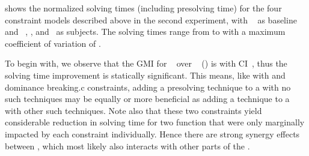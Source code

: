  shows the normalized solving
times (including \gls{presolving} time) for the four \glspl{constraint model}
described above in the second experiment, with ~ as \gls{baseline} and ~, ,
and~ as \glspl{subject}.
%
The solving times range from
\printMinSolvingTime{
  \SolvTechEnableOnlyGoodPresolvingPrePlusSolvingTimeSpeedupNonePrePlusSolvingTimeAvgMin,
  \SolvTechEnableOnlyGoodPresolvingPrePlusSolvingTimeSpeedupPrePlusSolvingTimeAvgMin,
  \SolvTechDisableBadPresolvingPrePlusSolvingTimeSpeedupPrePlusSolvingTimeAvgMin,
  \SolvTechDisableAllPresolvingPrePlusSolvingTimeSpeedupPrePlusSolvingTimeAvgMin
} to
\printMaxSolvingTime{
  \SolvTechEnableOnlyGoodPresolvingPrePlusSolvingTimeSpeedupNonePrePlusSolvingTimeAvgMax,
  \SolvTechEnableOnlyGoodPresolvingPrePlusSolvingTimeSpeedupPrePlusSolvingTimeAvgMax,
  \SolvTechDisableBadPresolvingPrePlusSolvingTimeSpeedupPrePlusSolvingTimeAvgMax,
  \SolvTechDisableAllPresolvingPrePlusSolvingTimeSpeedupPrePlusSolvingTimeAvgMax
} with a maximum coefficient of variation of
\numMaxOf{
  \SolvTechEnableOnlyGoodPresolvingPrePlusSolvingTimeSpeedupNonePrePlusSolvingTimeCvMax,
  \SolvTechEnableOnlyGoodPresolvingPrePlusSolvingTimeSpeedupPrePlusSolvingTimeCvMax,
  \SolvTechDisableBadPresolvingPrePlusSolvingTimeSpeedupPrePlusSolvingTimeCvMax,
  \SolvTechDisableAllPresolvingPrePlusSolvingTimeSpeedupPrePlusSolvingTimeCvMax
}.

To begin with, we observe that the \gls{GMI} for ~ over ~
() is \printGMI{%
  \SolvTechEnableOnlyGoodPresolvingPrePlusSolvingTimeSpeedupPrePlusSolvingTimeRegularSpeedupGmean%
} with \gls{CI}~\printGMICI{%
  \SolvTechEnableOnlyGoodPresolvingPrePlusSolvingTimeSpeedupPrePlusSolvingTimeRegularSpeedupCiMin%
}{%
  \SolvTechEnableOnlyGoodPresolvingPrePlusSolvingTimeSpeedupPrePlusSolvingTimeRegularSpeedupCiMax%
}, thus the solving time improvement is statically significant.
%
This means, like with  and \gls{dominance
  breaking.c} \glspl{constraint}, adding a \gls{presolving} technique to a
 with no such techniques may be equally or more
beneficial as adding a technique to a  with other
such techniques.
%
Note also that these two \glspl{constraint} yield considerable reduction in
solving time for two \gls{function} that were only marginally impacted by each
\gls{constraint} individually.
%
Hence there are strong synergy effects between , which most likely also interacts with other
parts of the .

